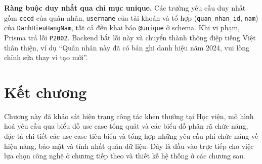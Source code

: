 \documentclass[../DoAn.tex]{subfiles}
\begin{document}
\textbf{Ràng buộc duy nhất qua chỉ mục unique.} Các trường yêu cầu duy nhất gồm \texttt{cccd} của quân nhân, \texttt{username} của tài khoản và tổ hợp (\texttt{quan\_nhan\_id}, \texttt{nam}) của \texttt{DanhHieuHangNam}, tất cả đều khai báo \texttt{@unique} ở schema. Khi vi phạm, Prisma trả lỗi \texttt{P2002}. Backend bắt lỗi này và chuyển thành thông điệp tiếng Việt thân thiện, ví dụ ``Quân nhân này đã có bản ghi danh hiệu năm 2024, vui lòng chỉnh sửa thay vì tạo mới''.

\section*{Kết chương}

Chương này đã khảo sát hiện trạng công tác khen thưởng tại Học viện, mô hình hoá yêu cầu qua biểu đồ use case tổng quát và các biểu đồ phân rã chức năng, đặc tả chi tiết các use case tiêu biểu và tổng hợp những yêu cầu phi chức năng về hiệu năng, bảo mật và tính nhất quán dữ liệu. Đây là đầu vào trực tiếp cho việc lựa chọn công nghệ ở chương tiếp theo và thiết kế hệ thống ở các chương sau.
\end{document}
